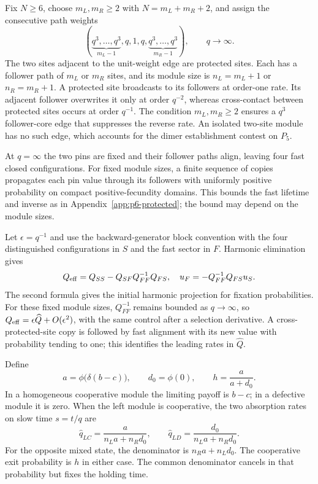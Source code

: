 \documentclass[aps,pre,reprint,amsmath,amssymb,longbibliography]{revtex4-2}
\begin{document}
Fix $N\geq6$, choose $m_L,m_R\geq2$ with $N=m_L+m_R+2$, and assign
the consecutive path weights
\begin{equation}
 \left(\underbrace{q^3,\ldots,q^3}_{m_L-1},q,1,q,
 \underbrace{q^3,\ldots,q^3}_{m_R-1}\right),\qquad q\to\infty.
 \label{app:path-general-weights}
\end{equation}
The two sites adjacent to the unit-weight edge are protected sites.
Each has a follower path of $m_L$ or $m_R$ sites, and its module size is
$n_L=m_L+1$ or $n_R=m_R+1$. A protected site broadcasts to its followers
at order-one rate. Its adjacent follower overwrites it only at order
$q^{-2}$, whereas cross-contact between protected sites occurs at order
$q^{-1}$. The condition $m_L,m_R\geq2$ ensures a $q^3$ follower-core
edge that suppresses the reverse rate. An isolated two-site module has
no such edge, which accounts for the dimer establishment contest on $P_5$.

At $q=\infty$ the two pins are fixed and their follower paths align,
leaving four fast closed configurations. For fixed module sizes, a finite
sequence of copies propagates each pin value through its followers with
uniformly positive probability on compact positive-fecundity domains.
This bounds the fast lifetime and inverse as in
Appendix~\ref{app:p6-protected}; the bound may depend on the module sizes.

Let $\epsilon=q^{-1}$ and use the backward-generator block convention
with the four distinguished configurations in $S$ and the fast sector
in $F$. Harmonic elimination gives
\begin{equation}
 Q_{\rm eff}=Q_{SS}-Q_{SF}Q_{FF}^{-1}Q_{FS},\quad
 u_F=-Q_{FF}^{-1}Q_{FS}u_S.
 \label{app:path-schur-reduction}
\end{equation}
The second formula gives the initial harmonic projection for fixation
probabilities. For these fixed module sizes, $Q_{FF}^{-1}$ remains bounded
as $q\to\infty$, so $Q_{\rm eff}=\epsilon\widehat Q+O(\epsilon^2)$,
with the same control
after a selection derivative. A cross-protected-site copy is followed
by fast alignment with its new value with probability tending to one;
this identifies the leading rates in $\widehat Q$.

Define
\begin{equation}
 a=\phi\bigl(\delta(b-c)\bigr),\qquad d_0=\phi(0),\qquad
 h=\frac{a}{a+d_0}.
 \label{app:path-general-fecundities}
\end{equation}
In a homogeneous cooperative module the limiting payoff is $b-c$;
in a defective module it is zero. When the left module is cooperative,
the two absorption rates on slow time $s=t/q$ are
\begin{equation}
 \widehat q_{LC}=\frac{a}{n_La+n_Rd_0},\qquad
 \widehat q_{LD}=\frac{d_0}{n_La+n_Rd_0}.
 \label{app:path-general-left-rates}
\end{equation}
For the opposite mixed state, the denominator is $n_Ra+n_Ld_0$.
The cooperative exit probability is $h$ in either case. The common
denominator cancels in that probability but fixes the holding time.
\end{document}
